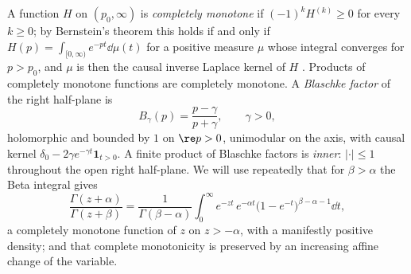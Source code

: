 A function $H$ on $(p_0,\infty)$ is \emph{completely monotone} if
$(-1)^kH^{(k)}\ge0$ for every $k\ge0$; by Bernstein's theorem this holds if and
only if $H(p)=\int_{[0,\infty)}e^{-pt}\dd\mu(t)$ for a positive measure $\mu$
whose integral converges for $p>p_0$, and $\mu$ is then the causal inverse
Laplace kernel of $H$ \cite{SSV}. Products of completely monotone functions are
completely monotone. A \emph{Blaschke factor} of the right half-plane is
\begin{equation}\label{eq:blaschke}
 B_\gamma(p)=\frac{p-\gamma}{p+\gamma},\qquad\gamma>0,
\end{equation}
holomorphic and bounded by $1$ on $\re p>0$, unimodular on the axis, with causal
kernel $\delta_0-2\gamma e^{-\gamma t}\mathbf 1_{t>0}$. A finite product of
Blaschke factors is \emph{inner}: $\lvert\cdot\rvert\le1$ throughout the open
right half-plane. We will use repeatedly that for $\beta>\alpha$ the Beta
integral gives
\begin{equation}\label{eq:betadensity}
 \frac{\Gamma(z+\alpha)}{\Gamma(z+\beta)}
 =\frac1{\Gamma(\beta-\alpha)}\int_0^\infty e^{-zt}\,
 e^{-\alpha t}\big(1-e^{-t}\big)^{\beta-\alpha-1}\dd t ,
\end{equation}
a completely monotone function of $z$ on $z>-\alpha$, with a manifestly positive
density; and that complete monotonicity is preserved by an increasing affine
change of the variable.
